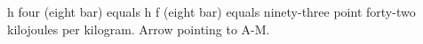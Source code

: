 h four (eight bar) equals h f (eight bar) equals ninety-three point forty-two kilojoules per kilogram.  
Arrow pointing to A-M.